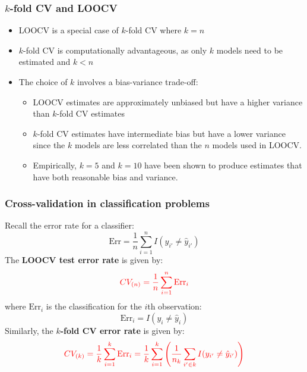 \documentclass[smaller]{beamer}
\newcommand{\lt}{\left}
\newcommand{\rt}{\right}
\newcommand{\?}{\stackrel{?}{=}}
\newcommand{\fr}{\frac}
\newcommand{\rd}{\color{red}}
\newcommand{\Err}{\text{Err}}
\begin{document}
\begin{frame}
  \frametitle{$k$-fold CV and LOOCV}
  \pause
  \begin{itemize}[<+->]
  \item LOOCV is a special case of $k$-fold CV \pause
    where $k = n$
  \item $k$-fold CV is computationally advantageous, as only $k$ models need to be estimated and $k < n$
  \item The choice of $k$ involves a bias-variance trade-off:
    \begin{itemize}
    \item LOOCV estimates are approximately unbiased but have a higher variance than $k$-fold CV estimates
    \item $k$-fold CV estimates have intermediate bias but have a lower variance since the $k$ models are less correlated than the $n$ models used in LOOCV.
    \item Empirically, $k=5$ and $k=10$ have been shown to produce estimates that have both reasonable bias and variance.
    \end{itemize}
  \end{itemize}
\end{frame}

\begin{frame}
  \frametitle{Cross-validation in classification problems}
  Recall the error rate for a classifier:
  \begin{equation}
    \label{eq:16}
    \Err =  \fr1n \sum_{i=1}^n I( y_{i'} \ne \hat y_{i'}) 
  \end{equation}
  \pause
  The \textbf{\rd LOOCV test error rate} is given by:
  \begin{equation}
    \label{eq:17}\rd
    CV_{(n)} = \fr1n \sum_{i=1}^n \Err_i
  \end{equation}\pause
  where $\Err_i$ is the classification for the $i$th observation:\pause
  \begin{equation}
    \label{eq:18}
    \Err_i = I( y_i \ne \hat y_i) 
  \end{equation}
  Similarly, the \textbf{\rd $k$-fold CV error rate} is given by:
  \begin{equation}
    \label{eq:19}\rd 
    CV_{(k)} = \fr1k \sum_{i=1}^k \Err_i = \fr1k \sum_{i=1}^k \lt(\fr1{n_k} \sum_{i' \in k} I(y_{i'} \ne \hat y_{i'})\rt)
  \end{equation}
\end{frame}
\end{document}
